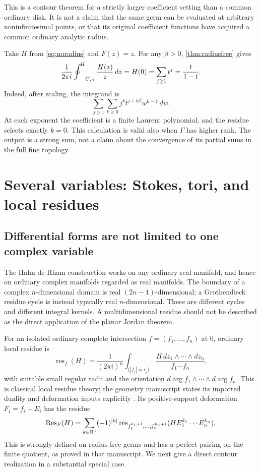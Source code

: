 \documentclass[11pt,letterpaper]{article}
\theoremstyle{definition}
\theoremstyle{remark}
\newcommand{\Res}{\operatorname{Res}}\newcommand{\res}{\operatorname{res}}\newcommand{\ord}{\operatorname{ord}}\newcommand{\Tr}{\operatorname{Tr}}
\numberwithin{equation}{section}
\begin{document}
This is a contour theorem for a strictly larger coefficient setting than a common ordinary disk. It is not a claim that the same germ can be evaluated at arbitrary noninfinitesimal points, or that its original coefficient functions have acquired a common ordinary analytic radius.

\begin{example}\label{ex:radiusfreevalue}
Take $H$ from \eqref{eq:noradius} and $F(z)=z$. For any $\beta>0$, \cref{thm:radiusfree} gives
\begin{equation}\label{eq:radiusfreevalue}
 \frac1{2\pi i}\mathop{\oint^{\!H}}\nolimits_{C_{t^\beta}}\frac{H(z)}z\,dz
 =H(0)=\sum_{j\ge1}t^j=\frac{t}{1-t}.
\end{equation}
Indeed, after scaling, the integrand is
\[
 \sum_{j\ge1}\sum_{k\ge0}j^k t^{j+k\beta}w^{k-1}\,dw.
\]
At each exponent the coefficient is a finite Laurent polynomial, and the residue selects exactly $k=0$. This calculation is valid also when $\Gamma$ has higher rank. The output is a strong sum, not a claim about the convergence of its partial sums in the full fine topology.
\end{example}

\section{Several variables: Stokes, tori, and local residues}\label{sec:multivariable}
\subsection{Differential forms are not limited to one complex variable}
The Hahn de Rham construction works on any ordinary real manifold, and hence on ordinary complex manifolds regarded as real manifolds. The boundary of a complex $n$-dimensional domain is real $(2n-1)$-dimensional; a Grothendieck residue cycle is instead typically real $n$-dimensional. These are different cycles and different integral kernels. A multidimensional residue should not be described as the direct application of the planar Jordan theorem.

For an isolated ordinary complete intersection $f=(f_1,\ldots,f_n)$ at $0$, ordinary local residue is
\[
 \res_f(H)=\frac1{(2\pi i)^n}
 \int_{\{|f_j|=\epsilon_j\}}
       \frac{H\,dz_1\wedge\cdots\wedge dz_n}{f_1\cdots f_n},
\]
with suitable small regular radii and the orientation $d\arg f_1\wedge\cdots\wedge d\arg f_n$. This is classical local residue theory; the geometry manuscript states its imported duality and deformation inputs explicitly \cite{Geometry,CDS}. Its positive-support deformation $F_i=f_i+E_i$ has the residue
\begin{equation}\label{eq:multires}
 \Res_F(H)=\sum_{k\in\N^n}(-1)^{|k|}
       \res_{f_1^{k_1+1},\ldots,f_n^{k_n+1}}
                  (H E_1^{k_1}\cdots E_n^{k_n}).
\end{equation}
This is strongly defined on radius-free germs and has a perfect pairing on the finite quotient, as proved in that manuscript. We next give a direct contour realization in a substantial special case.
\end{document}
